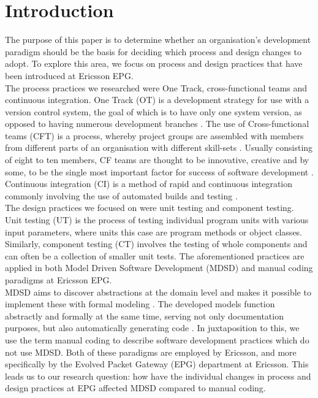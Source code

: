 \documentclass[fina_report_innit.tex]{subfiles}
\begin{document}
\section{Introduction}

The purpose of this paper is to determine whether an organisation's development paradigm should be the basis for deciding which process and design changes to adopt. To explore this area, we focus on process and design practices that have been introduced at Ericsson EPG.
\\

The process practices we researched were One Track, cross-functional teams and continuous integration. One Track (OT) is a development strategy for use with a version control system, the goal of which is to have only one system version, as opposed to having numerous development branches \cite{hribar2008first}. The use of Cross-functional teams (CFT) is a process, whereby project groups are assembled with members from different parts of an organisation with different skill-sets \cite{henke1993perspective}\cite{ghobadi2011challenges}. Usually consisting of eight to ten members, CF teams are thought to be innovative, creative \cite{ghobadi2011challenges} and by some, to be the single most important factor for success of software development \cite{marchwinski2000technical}. Continuous integration (CI) is a method of rapid and continuous integration commonly involving the use of automated builds and testing \cite{sommerville10software}.  
\\

The design practices we focused on were unit testing and component testing. Unit testing (UT) is the process of testing individual program units with various input parameters, where units this case are program methods or object classes. Similarly, component testing (CT) involves the testing of whole components and can often be a collection of smaller unit tests. The aforementioned practices are applied in both Model Driven Software Development (MDSD) and manual coding paradigms at Ericsson EPG.
\\

MDSD aims to discover abstractions at the domain level and makes it possible to implement these with formal modeling \cite{stahl2006model}. The developed models function abstractly and formally at the same time, serving not only documentation purposes, but also automatically generating code \cite{stahl2006model}. In juxtaposition to this, we use the term manual coding to describe software development practices which do not use MDSD. Both of these paradigms are employed by Ericsson, and more specifically by the Evolved Packet Gateway (EPG) department at Ericsson. This leads us to our research question: how have the individual changes in process and design practices at EPG affected MDSD compared to manual coding.
\\
\end{document}
